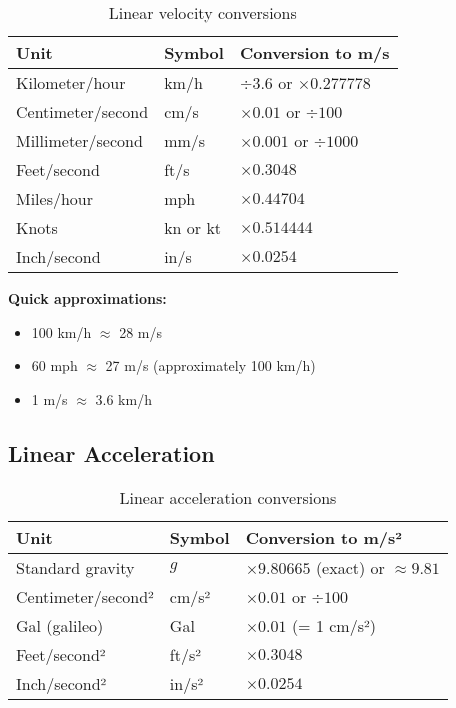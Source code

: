 \begin{table}[H]
\centering
\begin{tabular}{|l|l|l|}
\hline
\rowcolor{blue!20}
\textbf{Unit} & \textbf{Symbol} & \textbf{Conversion to m/s} \\
\hline
Kilometer/hour & km/h & $\div 3.6$ or $\times 0.277778$ \\
\hline
Centimeter/second & cm/s & $\times 0.01$ or $\div 100$ \\
\hline
Millimeter/second & mm/s & $\times 0.001$ or $\div 1000$ \\
\hline
\rowcolor{yellow!20}
Feet/second & ft/s & $\times 0.3048$ \\
\hline
\rowcolor{yellow!20}
Miles/hour & mph & $\times 0.44704$ \\
\hline
\rowcolor{yellow!20}
Knots & kn or kt & $\times 0.514444$ \\
\hline
\rowcolor{yellow!20}
Inch/second & in/s & $\times 0.0254$ \\
\hline
\end{tabular}
\caption{Linear velocity conversions}
\end{table}

\textbf{Quick approximations:}
\begin{itemize}
    \item 100 km/h $\approx$ 28 m/s
    \item 60 mph $\approx$ 27 m/s (approximately 100 km/h)
    \item 1 m/s $\approx$ 3.6 km/h
\end{itemize}

\subsection{Linear Acceleration}

\begin{table}[H]
\centering
\begin{tabular}{|l|l|l|}
\hline
\rowcolor{blue!20}
\textbf{Unit} & \textbf{Symbol} & \textbf{Conversion to m/s²} \\
\hline
Standard gravity & $g$ & $\times 9.80665$ (exact) or $\approx 9.81$ \\
\hline
Centimeter/second² & cm/s² & $\times 0.01$ or $\div 100$ \\
\hline
Gal (galileo) & Gal & $\times 0.01$ (= 1 cm/s²) \\
\hline
\rowcolor{yellow!20}
Feet/second² & ft/s² & $\times 0.3048$ \\
\hline
\rowcolor{yellow!20}
Inch/second² & in/s² & $\times 0.0254$ \\
\hline
\end{tabular}
\caption{Linear acceleration conversions}
\end{table}

